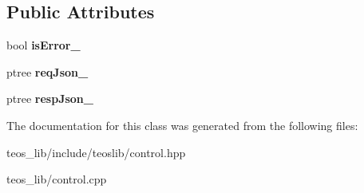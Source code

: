 \subsection*{Public Attributes}
\begin{DoxyCompactItemize}
\item 
\mbox{\label{classteos_1_1_teos_control_ac8e6788b523dcd724c7a424818da7849}} 
bool {\bfseries is\+Error\+\_\+}
\item 
\mbox{\label{classteos_1_1_teos_control_a6122f1a2263a80dacd315739861feac7}} 
ptree {\bfseries req\+Json\+\_\+}
\item 
\mbox{\label{classteos_1_1_teos_control_a1f5268be242e9f6182a083a4d4ec393e}} 
ptree {\bfseries resp\+Json\+\_\+}
\end{DoxyCompactItemize}


The documentation for this class was generated from the following files\+:\begin{DoxyCompactItemize}
\item 
teos\+\_\+lib/include/teoslib/control.\+hpp\item 
teos\+\_\+lib/control.\+cpp\end{DoxyCompactItemize}
